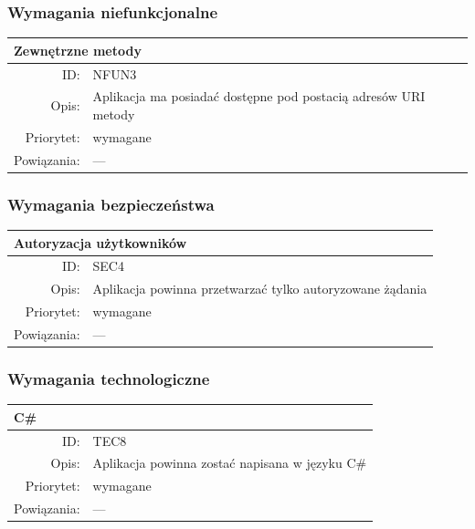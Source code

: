 
\subsubsection{Wymagania niefunkcjonalne}
 \begin{center}
    \begin{tabular}{rp{10cm}}
      \multicolumn{2}{l}{\textbf{Zewnętrzne metody}} \\
      \hline
      ID: & NFUN3 \\
      Opis: & Aplikacja ma posiadać dostępne pod postacią adresów URI metody \\
      Priorytet: & wymagane \\
      Powiązania: & --- \\
    \end{tabular}
    \end{center}

\subsubsection{Wymagania bezpieczeństwa}
\begin{center}
      \begin{tabular}{rp{10cm}}
	      \multicolumn{2}{l}{\textbf{Autoryzacja użytkowników}} \\
	      \hline
	      ID: & SEC4 \\
	      Opis: & Aplikacja powinna przetwarzać tylko autoryzowane żądania \\
	      Priorytet: & wymagane \\
	      Powiązania: & --- \\
    \end{tabular}
\end{center}


\subsubsection{Wymagania technologiczne}
      \begin{center}
      \begin{tabular}{rp{10cm}}
        \multicolumn{2}{l}{\textbf{C\#}} \\
        \hline
        ID: & TEC8 \\
        Opis: & Aplikacja powinna zostać napisana w języku C\#\\
        Priorytet: & wymagane \\
        Powiązania: & --- \\
      \end{tabular}
      \end{center}

